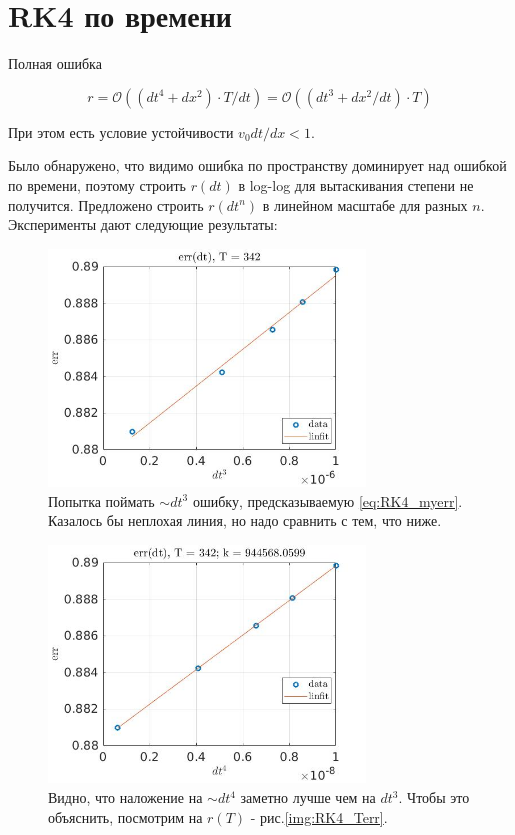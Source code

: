 \documentclass[a4paper,12pt]{article} %
\begin{document}
\section{RK4 по времени}

Полная ошибка 

\begin{equation} \label{eq:RK4_myerr}
r = \mathcal{O}((dt^4 + dx^2) \cdot T/dt) = \mathcal{O}((dt^3 + dx^2/dt) \cdot T)
\end{equation}

При этом есть условие устойчивости $v_0 dt/dx < 1$.

Было обнаружено, что видимо ошибка по пространству доминирует над ошибкой по времени, поэтому строить $r(dt)$ в log-log для вытаскивания степени не получится. Предложено строить $r(dt^n)$ в линейном масштабе для разных $n$. Эксперименты дают следующие результаты:

\newpage

\begin{figure}[h!]
\begin{center}
\includegraphics[width=0.75\textwidth]{./pics/RK4_dt3}
\end{center}
\caption{Попытка поймать $\sim dt^3$ ошибку, предсказываемую \eqref{eq:RK4_myerr}. Казалось бы неплохая линия, но надо сравнить с тем, что ниже.} \label{img:RK4_dt3}
\end{figure}

\begin{figure}[h!]
\begin{center}
\includegraphics[width=0.75\textwidth]{./pics/RK4_dt4}
\end{center}
\caption{Видно, что наложение на $\sim dt^4$ заметно лучше чем на $dt^3$. Чтобы это объяснить, посмотрим на $r(T)$ - рис.\ref{img:RK4_Terr}.} \label{img:RK4_dt4}
\end{figure}
\end{document}
